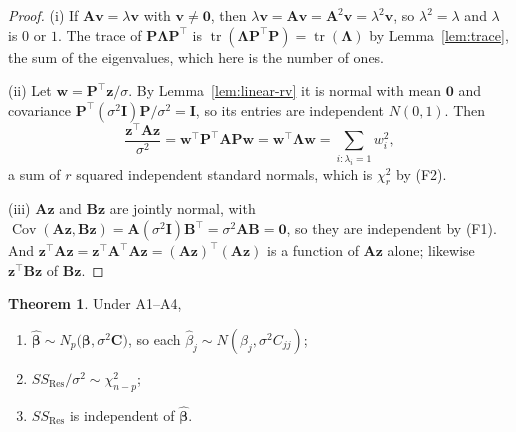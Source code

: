 \documentclass[11pt,a4paper]{article}
\numberwithin{equation}{section}
\theoremstyle{definition}
\newtheorem{thm}{Theorem}[subsection]
\begin{document}
\begin{proof}
(i) If $\mathbf{Av} = \lambda\mathbf{v}$ with $\mathbf{v} \neq \mathbf{0}$, then
$\lambda\mathbf{v} = \mathbf{Av} = \mathbf{A}^2\mathbf{v} = \lambda^2\mathbf{v}$, so
$\lambda^2 = \lambda$ and $\lambda$ is $0$ or $1$. The trace of
$\mathbf{P}\boldsymbol\Lambda\mathbf{P}^\top$ is
$\operatorname{tr}(\boldsymbol\Lambda\mathbf{P}^\top\mathbf{P}) = \operatorname{tr}(\boldsymbol\Lambda)$
by Lemma~\ref{lem:trace}, the sum of the eigenvalues, which here is the number of ones.

(ii) Let $\mathbf{w} = \mathbf{P}^\top\mathbf{z}/\sigma$. By Lemma~\ref{lem:linear-rv} it is
normal with mean $\mathbf{0}$ and covariance
$\mathbf{P}^\top(\sigma^2\mathbf{I})\mathbf{P}/\sigma^2 = \mathbf{I}$, so its entries are
independent $N(0,1)$. Then
\[
\frac{\mathbf{z}^\top\mathbf{A}\mathbf{z}}{\sigma^2}
= \mathbf{w}^\top\mathbf{P}^\top\mathbf{A}\mathbf{P}\mathbf{w} = \mathbf{w}^\top\boldsymbol\Lambda\mathbf{w}
= \sum_{i\colon \lambda_i = 1} w_i^2 ,
\]
a sum of $r$ squared independent standard normals, which is $\chi^2_r$ by (F2).

(iii) $\mathbf{Az}$ and $\mathbf{Bz}$ are jointly normal, with
$\operatorname{Cov}(\mathbf{Az}, \mathbf{Bz}) = \mathbf{A}(\sigma^2\mathbf{I})\mathbf{B}^\top = \sigma^2\mathbf{AB} = \mathbf{0}$,
so they are independent by (F1). And
$\mathbf{z}^\top\mathbf{A}\mathbf{z} = \mathbf{z}^\top\mathbf{A}^\top\mathbf{A}\mathbf{z} = (\mathbf{Az})^\top(\mathbf{Az})$
is a function of $\mathbf{Az}$ alone; likewise $\mathbf{z}^\top\mathbf{B}\mathbf{z}$ of $\mathbf{Bz}$.
\end{proof}

\begin{thm}\label{thm:mlr-dist}
Under A1--A4,
\begin{enumerate}[label=(\roman*)]
\item $\hat{\boldsymbol\beta} \sim N_p\bigl(\boldsymbol\beta, \sigma^2\mathbf{C}\bigr)$, so each $\hat\beta_j \sim N(\beta_j, \sigma^2 C_{jj})$;
\item $SS_{\mathrm{Res}}/\sigma^2 \sim \chi^2_{n-p}$;
\item $SS_{\mathrm{Res}}$ is independent of $\hat{\boldsymbol\beta}$.
\end{enumerate}
\end{thm}
\end{document}
